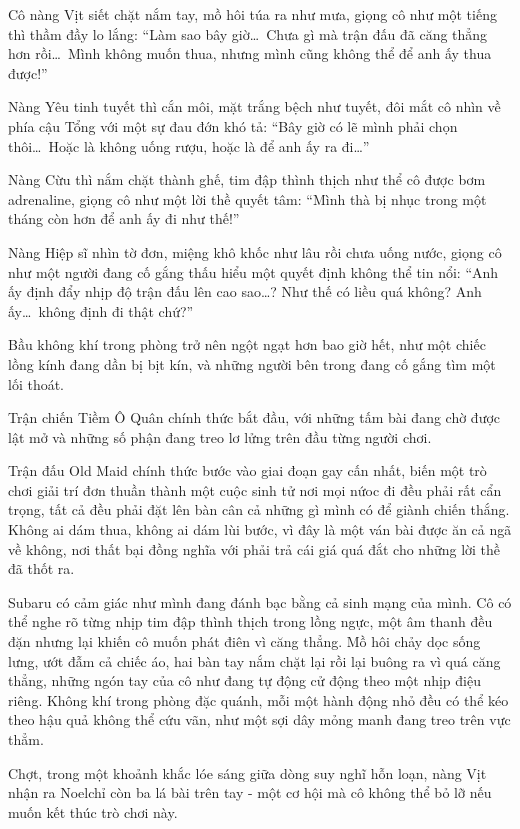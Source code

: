 \documentclass[../main.tex]{subfiles}
\begin{document}
Cô nàng Vịt siết chặt nắm tay, mồ hôi túa ra như mưa, giọng cô như một tiếng thì thầm đầy lo lắng: ``Làm sao bây giờ\dots\ Chưa gì mà trận đấu đã căng thẳng hơn rồi\dots\ Mình không muốn thua, nhưng mình cũng không thể để anh ấy thua được!''

Nàng Yêu tinh tuyết thì cắn môi, mặt trắng bệch như tuyết, đôi mắt cô nhìn về phía cậu Tổng với một sự đau đớn khó tả: ``Bây giờ có lẽ mình phải chọn thôi\dots\ Hoặc là không uống rượu, hoặc là để anh ấy ra đi\dots''

Nàng Cừu thì nắm chặt thành ghế, tim đập thình thịch như thể cô được bơm adrenaline, giọng cô như một lời thề quyết tâm: ``Mình thà bị nhục trong một tháng còn hơn để anh ấy đi như thế!''

Nàng Hiệp sĩ nhìn tờ đơn, miệng khô khốc như lâu rồi chưa uống nước, giọng cô như một người đang cố gắng thấu hiểu một quyết định không thể tin nổi: ``Anh ấy định đẩy nhịp độ trận đấu lên cao sao\dots? Như thế có liều quá không? Anh ấy\dots\ không định đi thật chứ?''

Bầu không khí trong phòng trở nên ngột ngạt hơn bao giờ hết, như một chiếc lồng kính đang dần bị bịt kín, và những người bên trong đang cố gắng tìm một lối thoát.

Trận chiến Tiềm Ô Quân chính thức bắt đầu, với những tấm bài đang chờ được lật mở và những số phận đang treo lơ lửng trên đầu từng người chơi.

\ct

Trận đấu Old Maid chính thức bước vào giai đoạn gay cấn nhất, biến một trò chơi giải trí đơn thuần thành một cuộc sinh tử nơi mọi nứoc đi đều phải rất cẩn trọng, tất cả đều phải đặt lên bàn cân cả những gì mình có để giành chiến thắng. Không ai dám thua, không ai dám lùi bước, vì đây là một ván bài được ăn cả ngã về không, nơi thất bại đồng nghĩa với phải trả cái giá quá đắt cho những lời thề đã thốt ra.

Subaru có cảm giác như mình đang đánh bạc bằng cả sinh mạng của mình. Cô có thể nghe rõ từng nhịp tim đập thình thịch trong lồng ngực, một âm thanh đều đặn nhưng lại khiến cô muốn phát điên vì căng thẳng. Mồ hôi chảy dọc sống lưng, ướt đẫm cả chiếc áo, hai bàn tay nắm chặt lại rồi lại buông ra vì quá căng thẳng, những ngón tay của cô như đang tự động cử động theo một nhịp điệu riêng. Không khí trong phòng đặc quánh, mỗi một hành động nhỏ đều có thể kéo theo hậu quả không thể cứu vãn, như một sợi dây mỏng manh đang treo trên vực thẳm.

Chợt, trong một khoảnh khắc lóe sáng giữa dòng suy nghĩ hỗn loạn, nàng Vịt nhận ra Noelchỉ còn ba lá bài trên tay - một cơ hội mà cô không thể bỏ lỡ nếu muốn kết thúc trò chơi này.
\end{document}
